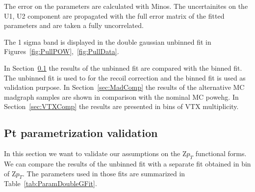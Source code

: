 \documentclass[41pt,a4paper,oneside]{report}
\begin{document}
The error on the parameters are calculated with Minos. 
The uncertainites on the U1, U2 component are propagated with the full error matrix of the fitted parameters and are taken a fully uncorrelated.


The 1 sigma band is displayed in the double gaussian unbinned fit in Figures~\ref{fig:PullPOW},~\ref{fig:PullData}.



In Section~\ref{sec:PtParam} the results of the unbinned fit are compared with the binned fit.
The unbinned fit is used to for the recoil correction and the binned fit is used as validation purpose.
In Section~\ref{sec:MadComp} the results of the alternative MC madgraph samples are shown in comparison with the nominal MC powehg.
In Section~\ref{sec:VTXComp} the results are presented in bins of VTX multiplicity.



\subsection{Pt parametrization validation}
\label{sec:PtParam}

In this section we want to validate our assumptions on the Z$p_{T}$ functional forms. We can compare the results of the unbinned fit with a separate fit obtained in bin of Z$p_{T}$. 
The parameters used in those fits are summarized in Table~\ref{tab:ParamDoubleGFit}.
\end{document}
